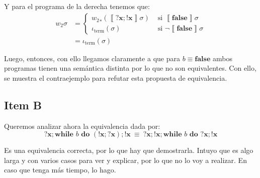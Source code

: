 \documentclass{article}
\newcommand{\sem}[1]{\left\llbracket #1\right\rrbracket}
\newcommand{\x}{\textbf{x}}
\newcommand{\cfalse}{\textbf{false}}
\newcommand{\cwhile}[2]{\textbf{while }#1\textbf{ do }#2}
\newcommand{\iterm}[1]{\iota_\text{term}\left(#1\right)}
\begin{document}
Y para el programa de la derecha tenemos que:
\begin{equation*}
  \begin{aligned}
    w_2 \sigma &= \begin{cases}
                {w_2}_* (\sem{?\x; !\x} \sigma) &\text{ si }\sem{\cfalse}\sigma \\ 
                \iterm{\sigma} &\text{ si }\neg\sem{\cfalse}\sigma 
              \end{cases} \\ 
               &= \iterm{\sigma}
  \end{aligned}
\end{equation*}

Luego, entonces, con ello llegamos claramente a que para $b \equiv \cfalse$ ambos programas tienen una semántica distinta por lo que no son equivalentes.
Con ello, se muestra el contraejemplo para refutar esta propuesta de equivalencia.

\subsection*{Item B}
Queremos analizar ahora la equivalencia dada por:
\begin{equation*}
  ?\x; \cwhile{b}{(!\x; ?\x)}; !\x \ \equiv \ ?\x; !\x; \cwhile{b}{?\x; !\x}
\end{equation*}

Es una equivalencia correcta, por lo que hay que demostrarla.
Intuyo que es algo larga y con varios casos para ver y explicar, por lo que no lo voy a realizar.
En caso que tenga más tiempo, lo hago.
\end{document}

